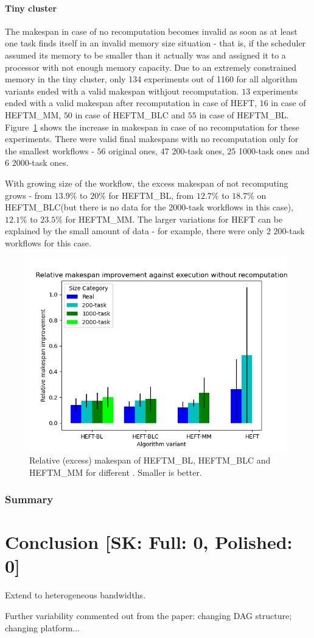 \documentclass[conference]{IEEEtran}
\newcommand{\algo}[1]{\textsc{#1}}
\newcommand{\heft}{\algo{HEFT}\xspace}
\newcommand{\heftmm}{\algo{HEFTM\_MM}\xspace}
\newcommand{\heftbl}{\algo{HEFTM\_BL}\xspace}
\newcommand{\heftblc}{\algo{HEFTM\_BLC}\xspace}
\newcommand{\skug}[1]{{\color{blue}[SK: #1]}}
\begin{document}
    \paragraph{Tiny cluster}
    The makespan in case of no recomputation becomes invalid as soon as at least one task finds itself in an invalid memory size
    situation - that is, if the scheduler assumed its memory to be smaller than it actually was and assigned it to a processor
    with not enough memory capacity.
    Due to an extremely constrained memory in the tiny cluster, only 134 experiments out of 1160 for all algorithm variants
    ended with a valid makespan withjout recomputation. $13$ experiments ended with a valid makespan after recomputation in case of \heft,
   $16$ in case of \heftmm, $50$ in case of \heftblc and $55$ in case of \heftbl.
    Figure~\ref{fig:updates-ms} shows the increase in makespan in case of no recomputation for these experiments.
    There were valid final makespans with no recomputation only for the smallest workflows - $56$ original ones, $47$ 200-task ones,
    $25$ 1000-task ones and $6$ 2000-task ones.

    With growing size of the workflow, the excess makespan of not recomputing grows - from $13.9\%$ to $20\%$ for \heftbl,
    from $12.7\%$ to $18.7\%$ on \heftblc (but there is no data for the 2000-task workflows in this case), $12.1\%$ to $23.5\%$
    for \heftmm.
    The larger variations for \heft can be explained by the small amount of data - for example, there were only 2 200-task
    workflows for this case.

    \begin{figure}[tb]
        \centering
        \includegraphics[width=0.495\columnwidth] {images/UpdatesMss2}
        \caption{Relative (excess) makespan of \heftbl, \heftblc and \heftmm for different . Smaller is better.}
        \label{fig:updates-ms}
        \vspace{-0.3cm}
    \end{figure}


    \subsubsection{Summary}

    \section{Conclusion  \skug{Full: 0, Polished: 0}}

Extend to heterogeneous bandwidths. 

Further variability commented out from the paper: changing DAG structure; changing platform...


    
    
\end{document}
